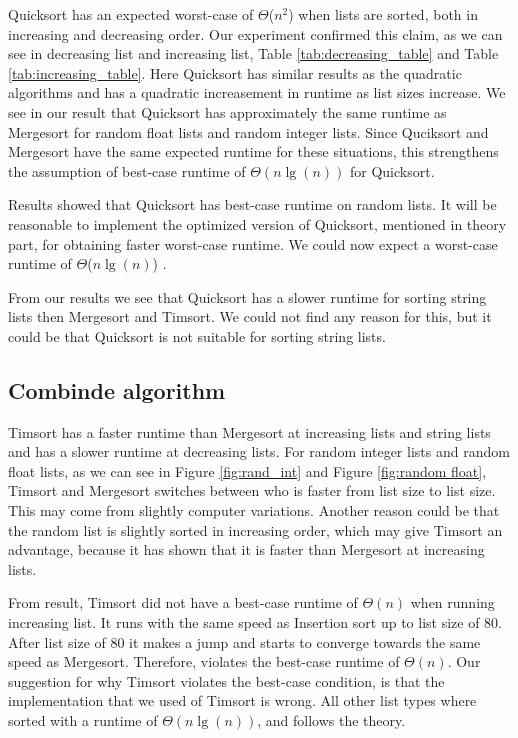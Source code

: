 \documentclass[sigconf, nonacm, natbib, screen, balance=False]{acmart}
\begin{document}
Quicksort has an expected worst-case of $\Theta$($n^2$) when lists are sorted, both in increasing and decreasing order. Our experiment confirmed this claim, as we can see in decreasing list and increasing list, Table \ref{tab:decreasing_table} and Table \ref{tab:increasing_table}. Here Quicksort has similar results as the quadratic algorithms and has a quadratic increasement in runtime as list sizes increase. We see in our result that Quicksort has approximately the same runtime as Mergesort for random float lists and random integer lists. Since Quciksort and Mergesort have the same expected runtime for these situations, this strengthens the assumption of best-case runtime of $\Theta(n\lg(n))$ for Quicksort.

Results showed that Quicksort has best-case runtime on random lists. It will be reasonable to implement the optimized version of Quicksort, mentioned in theory part, for obtaining faster worst-case runtime. We could now expect a worst-case runtime of $\Theta$($n\lg(n)$) \citet{CLRS_2009}.

From our results we see that Quicksort has a slower runtime for sorting string lists then Mergesort and Timsort. We could not find any reason for this, but it could be that Quicksort is not suitable for sorting string lists. 

\subsection{Combinde algorithm}
Timsort has a faster runtime than Mergesort at increasing lists and string lists and has a slower runtime at decreasing lists. For random integer lists and random float lists, as we can see in Figure \ref{fig:rand_int} and Figure \ref{fig:random float}, Timsort and Mergesort switches between who is faster from list size to list size. This may come from slightly computer variations. Another reason could be that the random list is slightly sorted in increasing order, which may give Timsort an advantage, because it has shown that it is faster than Mergesort at increasing lists.

From result, Timsort did not have a best-case runtime of $\Theta(n)$ when running increasing list. It runs with the same speed as Insertion sort up to list size of 80. After list size of 80 it makes a jump and starts to converge towards the same speed as Mergesort. Therefore, violates the best-case runtime of $\Theta(n)$. Our suggestion for why Timsort violates the best-case condition, is that the implementation that we used of Timsort is wrong. All other list types where sorted with a runtime of $\Theta(n\lg(n))$, and follows the theory.
\end{document}

